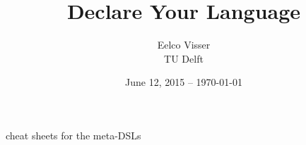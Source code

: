 \title{Declare Your Language}
	
\author{Eelco Visser\\[20pt]TU Delft}
	
\date{June 12, 2015 -- \today}
	


\newpage


%

\newpage


\newpage


% 
% 


% 
% 
	
cheat sheets for the meta-DSLs

